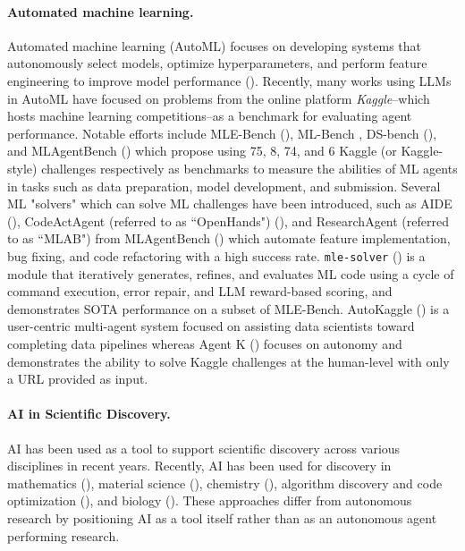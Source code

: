 \documentclass[11pt, a4paper]{include/gdm_format}
\begin{document}
\paragraph{Automated machine learning.}

Automated machine learning (AutoML) focuses on developing systems that autonomously select models, optimize hyperparameters, and perform feature engineering to improve model performance (\cite{he2021automl, tornede2023automl}). Recently, many works using LLMs in AutoML have focused on problems from the online platform \textit{Kaggle}--which hosts machine learning competitions--as a benchmark for evaluating agent performance. Notable efforts include MLE-Bench (\cite{chan2024mle}), ML-Bench \cite{nathani2025mlgym}, DS-bench (\cite{jing2024dsbench}), and MLAgentBench (\cite{huang2024mlagentbench}) which propose using 75, 8, 74, and 6 Kaggle (or Kaggle-style) challenges respectively as benchmarks to measure the abilities of ML agents in tasks such as data preparation, model development, and submission. Several ML "solvers" which can solve ML challenges have been introduced, such as AIDE (\cite{AIDE}), CodeActAgent (referred to as “OpenHands") (\cite{wang2024opendevin}), and ResearchAgent (referred to as “MLAB") from MLAgentBench (\cite{huang2024mlagentbench}) which automate feature implementation, bug fixing, and code refactoring with a high success rate. \texttt{mle-solver} (\cite{schmidgall2025agent}) is a module that iteratively generates, refines, and evaluates ML code using a cycle of command execution, error repair, and LLM reward-based scoring, and demonstrates SOTA performance on a subset of MLE-Bench. AutoKaggle (\cite{li2024autokaggle}) is a user-centric multi-agent system focused on assisting data scientists toward completing data pipelines whereas Agent K (\cite{grosnit2024large}) focuses on autonomy and demonstrates the ability to solve Kaggle challenges at the human-level with only a URL provided as input. 



\paragraph{AI in Scientific Discovery.} AI has been used as a tool to support scientific discovery across various disciplines in recent years. Recently, AI has been used for discovery in mathematics (\cite{romera2024mathematical, davies2021advancing, cornelio2023combining, shojaee2024llm}), material science (\cite{szymanski2023autonomous, pyzer2022accelerating, merchant2023scaling, jia2024llmatdesign, ding2024matexpert}), chemistry (\cite{jumper2021highly, hayes2024simulating, yang2024moose}), algorithm discovery and code optimization (\cite{lange2025ai, fawzi2022discovering}), and biology (\cite{ding2024automating, gottweis2025aicoscientist, abramson2024accurate}). These approaches differ from autonomous research by positioning AI as a tool itself rather than as an autonomous agent performing research.
\end{document}
